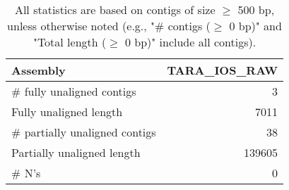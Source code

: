 \documentclass[12pt,a4paper]{article}
\begin{document}
\begin{table}[ht]
\begin{center}
\caption{All statistics are based on contigs of size $\geq$ 500 bp, unless otherwise noted (e.g., "\# contigs ($\geq$ 0 bp)" and "Total length ($\geq$ 0 bp)" include all contigs).}
\begin{tabular}{|l*{1}{|r}|}
\hline
Assembly & TARA\_IOS\_RAW \\ \hline
\# fully unaligned contigs & 3 \\ \hline
Fully unaligned length & 7011 \\ \hline
\# partially unaligned contigs & 38 \\ \hline
Partially unaligned length & 139605 \\ \hline
\# N's & 0 \\ \hline
\end{tabular}
\end{center}
\end{table}
\end{document}
